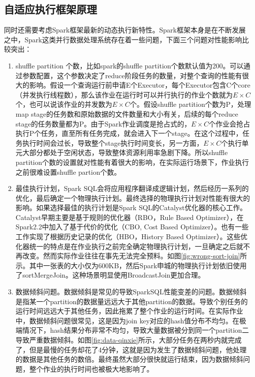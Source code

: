 \subsection{自适应执行框架原理}
同时还需要考虑Spark框架最新的动态执行新特性。Spark框架本身是在不断发展之中，Spark这类并行数据处理系统存在着一些问题，下面三个问题对性能影响比较突出：

\begin{enumerate}
    \item shuffle partition 个数，比如spark的shuffle partition个数默认值为200。可以通过参数配置，这个参数决定了reduce阶段任务的数量，对整个查询的性能有很大的影响。假设一个查询运行前申请E个Executor，每个Executor包含C个core（并发执行线程数），那么该作业在运行时可以并行执行的作业个数就为$E\times C$个，也可以说该作业的并发数为$E\times C$个。假设shuffle partition个数为P，处理map stage的任务数和原始数据的文件数量和大小有关，后续的每个reduce stage的任务数量都为P。由于Spark作业调度是抢占式的，$E\times C$个作业会抢占执行P个任务，直至所有任务完成，就会进入下一个stage。在这个过程中，任务执行时间会过长，导致整个stage执行时间变长，另一方面，$E\times C$个执行单元大部分都处于空闲状态，导致整体资源利用率急剧下降。所以shuffle partition个数的设置就对性能有着很大的影响，在实际运行场景下，作业执行之前很难设置shuffle partion个数。
    \item 最佳执行计划，Spark SQL会将应用程序翻译成逻辑计划，然后经历一系列的优化，最后确定一个物理执行计划。最终选择的物理执行计划对性能有很大的影响。如果选择最佳的执行计划是Spark SQL的Catalyst优化器的核心工作。Catalyst早期主要是基于规则的优化器（RBO，Rule Based Optimizer），在Spark2.2中加入了基于代价的优化（CBO, Cost Based Optimizer）。也有一些工作实现了根据历史记录的优化（HBO，History Based Optimizer）。这些优化器统一的特点是在作业执行之前完全确定物理执行计划，一旦确定之后就不再改变。然而实际作业往往在事先无法完全预料。如图\ref{fig:wrong-sort-join}所示。其中一张表的大小仅为600KB，然后Spark申城的物理执行计划依旧使用了sortMergeJoin。这种场景明显使用BroadcastJoin更加合理。
    \item 数据倾斜问题。数据倾斜是常见的导致SparkSQL性能变差的问题。数据倾斜是指某一个partition的数据量远远大于其他partition的数据。导致个别任务的运行时间远远大于其他任务，因此拖累了整个作业的运行时间。在实际作业中，数据倾斜问题很常见，这是因为join key对应的hash值分布不均匀。在极端情况下，hash结果分布非常不均匀，导致大量数据被分到同一个partition二导致严重数据倾斜。如图\ref{fig:data-qinxie}所示，大部分任务在两秒内就完成了，但是最慢的任务却花了4分钟，这就是因为发生了数据倾斜问题，他处理的数据是其他任务的数倍。最终虽然大部分很快就运行结束，因为数据倾斜问题，整个作业的执行时间也被极大地影响了。

\end{enumerate}

